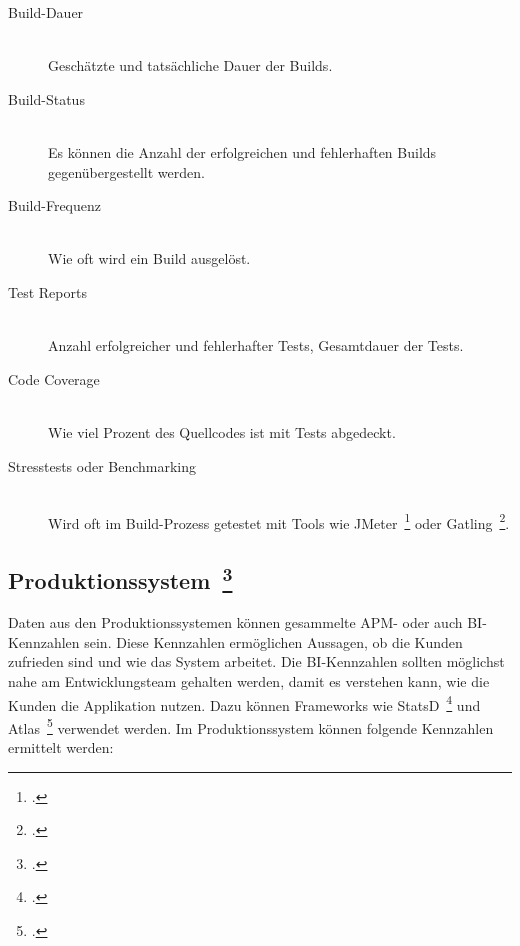 \begin{description}
  \item[Build-Dauer] \hfill \\ Geschätzte und tatsächliche Dauer der Builds.
  \item[Build-Status] \hfill \\ Es können die Anzahl der erfolgreichen und fehlerhaften Builds gegenübergestellt werden.
  \item[Build-Frequenz] \hfill \\ Wie oft wird ein Build ausgelöst.
  \item[Test Reports] \hfill \\ Anzahl erfolgreicher und fehlerhafter Tests, Gesamtdauer der Tests.
  \item[Code Coverage] \hfill \\ Wie viel Prozent des Quellcodes ist mit Tests abgedeckt.
  \item[Stresstests oder Benchmarking] \hfill \\ Wird oft im Build-Prozess getestet mit Tools wie JMeter~\footcite[][]{jmeter} oder Gatling~\footcite[][]{gatling}.
\end{description}

\clearpage
\subsection[Produktionssystem]{Produktionssystem~\footcite[vgl.][S.107ff]{davis_agile_2015}}

Daten aus den Produktionssystemen können gesammelte \ac{APM}- oder auch \ac{BI}-Kennzahlen sein.
Diese Kennzahlen ermöglichen Aussagen, ob die Kunden zufrieden sind und wie das System arbeitet.
Die \ac{BI}-Kennzahlen sollten möglichst nahe am Entwicklungsteam gehalten werden, damit es verstehen kann, wie die Kunden die Applikation nutzen.
Dazu können Frameworks wie StatsD~\footcite[][]{statsd} und Atlas~\footcite[][]{atlas} verwendet werden.
Im Produktionssystem können folgende Kennzahlen ermittelt werden:

